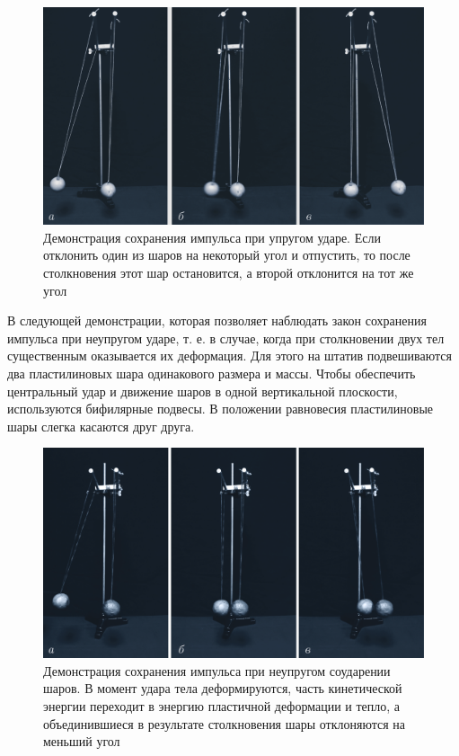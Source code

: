 \documentclass[14pt,a4paper,oneside]{extarticle}	%
\begin{document}
	\begin{figure}[H]
			\centering	
			\includegraphics[width=0.9\linewidth]{hit-2.png}
			\caption{Демонстрация сохранения импульса при упругом ударе. Если отклонить один из шаров на некоторый угол и отпустить, то после столкновения этот шар остановится, а второй отклонится на тот же угол}
			\label{hit-2}
		\end{figure}

В следующей демонстрации, которая позволяет наблюдать закон сохранения импульса при неупругом ударе, т. е. в случае, когда при столкновении двух тел существенным оказывается их деформация. Для этого на штатив подвешиваются два пластилиновых шара одинакового размера и массы. Чтобы обеспечить центральный удар и движение шаров в одной вертикальной плоскости, используются бифилярные подвесы.
В положении равновесия пластилиновые шары слегка касаются друг друга.

	\begin{figure}[H]
	\centering	
	\includegraphics[width=0.9\linewidth]{hit-3.png}
	\caption{Демонстрация сохранения импульса при неупругом соударении шаров. В момент удара тела деформируются, часть кинетической энергии переходит в энергию пластичной деформации и тепло, а объединившиеся в результате столкновения шары отклоняются на меньший угол}
	\label{hit-3}
\end{figure}
\end{document}
